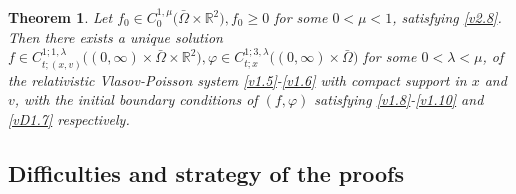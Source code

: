 \documentclass[11pt,reqno]{amsart}%
\newtheorem{Theorem}{Theorem}[section]
\theoremstyle{definition}
\theoremstyle{remark}
\begin{document}
\begin{Theorem}\label{T02}
 Let $f_{0} \in C^{1,\mu}_{0}\big(\bar{\Omega}\times\mathbb{R}^{2}\big), f_{0}\geq 0$ for some $0 <\mu< 1$, satisfying
\eqref{v2.8}. Then there exists
a unique solution $f \in C^{1;1,\lambda}_{t;(x,v)} \big((0,\infty)\times \bar{\Omega}\times \mathbb{R}^{2}\big),
\varphi\in  C^{1;3,\lambda}_{t;x}\big((0,\infty)\times \bar{\Omega}\big) $
for
some $0 < \lambda < \mu$, of the relativistic Vlasov-Poisson system \eqref{v1.5}-\eqref{v1.6} with compact support
in $x$ and $v$, with the  initial boundary conditions of $(f,\varphi)$ satisfying \eqref{v1.8}-\eqref{v1.10} and \eqref{vD1.7}  respectively.
\end{Theorem}
\subsection{Difficulties and strategy of the proofs}
\end{document}
